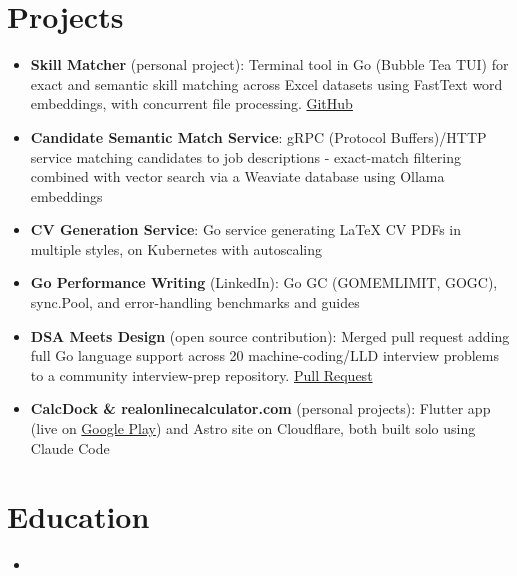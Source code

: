 \documentclass[11pt,a4paper,sans]{moderncv}
\begin{document}
\section{Projects}
\vspace{1pt}
\begin{itemize}

\item \textbf{Skill Matcher} (personal project): Terminal tool in Go (Bubble Tea TUI) for exact and semantic skill matching across Excel datasets using FastText word embeddings, with concurrent file processing. \href{https://github.com/Himanshujk/skill-matcher}{GitHub}

\item \textbf{Candidate Semantic Match Service}: gRPC (Protocol Buffers)/HTTP service matching candidates to job descriptions - exact-match filtering combined with vector search via a Weaviate database using Ollama embeddings

\item \textbf{CV Generation Service}: Go service generating LaTeX CV PDFs in multiple styles, on Kubernetes with autoscaling

\item \textbf{Go Performance Writing} (LinkedIn): Go GC (GOMEMLIMIT, GOGC), sync.Pool, and error-handling benchmarks and guides

\item \textbf{DSA Meets Design} (open source contribution): Merged pull request adding full Go language support across 20 machine-coding/LLD interview problems to a community interview-prep repository. \href{https://github.com/jkaus324/machine-coding-interview-questions/pull/2}{Pull Request}

\item \textbf{CalcDock \& realonlinecalculator.com} (personal projects): Flutter app (live on \href{https://play.google.com/store/apps/details?id=com.realonlinecalculator.calcdock}{Google Play}) and Astro site on Cloudflare, both built solo using Claude Code

\end{itemize}


\section{Education}
\vspace{1pt}
\begin{itemize}

\item{}

\end{itemize}
\end{document}
